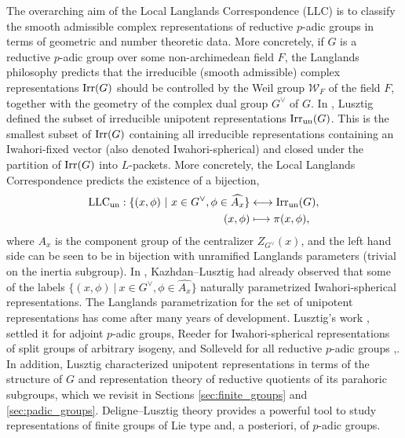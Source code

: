 The overarching aim of the Local Langlands Correspondence (LLC) is to classify the smooth admissible complex representations of reductive $p$-adic groups in terms of geometric and number theoretic data. More concretely, if $G$ is a reductive $p$-adic group over some non-archimedean field $F$, the Langlands philosophy predicts that the irreducible (smooth admissible) complex representations $\mathrm{Irr}(G)$ should be controlled by the Weil group $\mathcal{W}_F$ of the field $F$, together with the geometry of the complex dual group $G^\vee$ of $G$. In \cite{Lusztig1995}, Lusztig defined the subset of irreducible unipotent representations $\mathrm{Irr}_{\mathrm{un}}(G)$. This is the smallest subset of $\mathrm{Irr}(G)$ containing all irreducible representations containing an Iwahori-fixed vector (also denoted Iwahori-spherical) and closed under the partition of $\mathrm{Irr}(G)$ into $L$-packets. More concretely, the Local Langlands Correspondence predicts the existence of a bijection,
\begin{align}
    \mathrm{LLC}_{\mathrm{un}}: \{(x,\phi)\ |\ x\in G^\vee, \phi\in\widehat{A_x}\}&\longleftrightarrow\mathrm{Irr}_{\mathrm{un}}(G),\\\notag
    (x,\phi)&\longmapsto\pi(x,\phi),
\end{align}
where $A_x$ is the component group of the centralizer $Z_{G^\vee}(x)$, and the left hand side can be seen to be in bijection with unramified Langlands parameters (trivial on the inertia subgroup). In \cite{KazhdanLusztig1987}, Kazhdan--Lusztig had already observed that some of the labels $\{(x,\phi)\ |\ x\in G^\vee, \phi\in\widehat{A_x}\}$ naturally parametrized Iwahori-spherical representations. The Langlands parametrization for the set of unipotent representations has come after many years of development. Lusztig's work \cite{Lusztig1995}, \cite{Lusztig2002} settled it for adjoint $p$-adic groups, Reeder \cite{Reeder2002} for Iwahori-spherical representations of split groups of arbitrary isogeny, and Solleveld for all reductive $p$-adic groups \cite{Solleveld2023},\cite{Solleveld2023b}. In addition, Lusztig characterized unipotent representations in terms of the structure of $G$ and representation theory of reductive quotients of its parahoric subgroups, which we revisit in Sections \ref{sec:finite_groups} and \ref{sec:padic_groups}. Deligne--Lusztig theory provides a powerful tool to study representations of finite groups of Lie type and, a posteriori, of $p$-adic groups.

